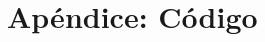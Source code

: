 \documentclass[10pt, a4paper]{article}
\begin{document}
\section{Apéndice: Código}




\newpage


\end{document}
